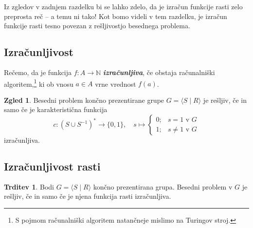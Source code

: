 \documentclass[11pt]{book}
\def\NN{\mathbb{N}}
\def\definicija{\color{rdeca}\bf\em}
\theoremstyle{definition}
\theoremstyle{zgled}
\newtheorem*{zgled}{Zgled}
\theoremstyle{odprtproblem}
\theoremstyle{domacanaloga}
\theoremstyle{izrek}
\newtheorem*{trditev}{Trditev}
\begin{document}
Iz zgledov v zadnjem razdelku bi se lahko zdelo, da je izračun funkcije rasti zelo preprosta reč -- a temu ni tako! Kot bomo videli v tem razdelku, je izračun funkcije rasti tesno povezan z rešljivostjo besednega problema.

\subsection{Izračunljivost}

Rečemo, da je funkcija $f \colon A \to \NN$ {\definicija izračunljiva}, če obstaja računalniški algoritem,\footnote{S pojmom računalniški algoritem natančneje mislimo na Turingov stroj.} ki ob vnosu $a \in A$ vrne vrednost $f(a)$.

\begin{zgled}
Besedni problem končno prezentirane grupe $G = \langle S \mid R \rangle$ je rešljiv, če in samo če je karakteristična funkcija
\[
c \colon (S \cup S^{-1})^* \to \{ 0, 1 \}, \quad s \mapsto \begin{cases} 0; & \text{$s=1$ v $G$} \\ 1; & \text{$s\neq 1$ v $G$}
\end{cases}
\]
izračunljiva.
\end{zgled}

\subsection{Izračunljivost rasti}

\begin{trditev}
Bodi $G = \langle S \mid R \rangle$ končno prezentirana grupa. Besedni problem v $G$ je rešljiv, če in samo če je njena funkcija rasti izračunljiva.
\end{trditev}
\end{document}
